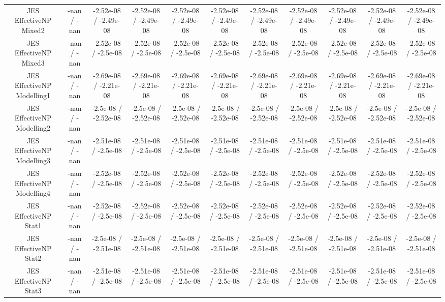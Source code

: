 \begin{table}[htbp]
\begin{center}
\begin{tabular}{|c|c|c|c|c|c|c|c|c|c|c|}
  JES EffectiveNP Mixed2 & -nan / -nan & -2.52e-08 / -2.49e-08 & -2.52e-08 / -2.49e-08 & -2.52e-08 / -2.49e-08 & -2.52e-08 / -2.49e-08 & -2.52e-08 / -2.49e-08 & -2.52e-08 / -2.49e-08 & -2.52e-08 / -2.49e-08 & -2.52e-08 / -2.49e-08 & -2.52e-08 / -2.49e-08 \\ 
  JES EffectiveNP Mixed3 & -nan / -nan & -2.52e-08 / -2.5e-08 & -2.52e-08 / -2.5e-08 & -2.52e-08 / -2.5e-08 & -2.52e-08 / -2.5e-08 & -2.52e-08 / -2.5e-08 & -2.52e-08 / -2.5e-08 & -2.52e-08 / -2.5e-08 & -2.52e-08 / -2.5e-08 & -2.52e-08 / -2.5e-08 \\ 
  JES EffectiveNP Modelling1 & -nan / -nan & -2.69e-08 / -2.21e-08 & -2.69e-08 / -2.21e-08 & -2.69e-08 / -2.21e-08 & -2.69e-08 / -2.21e-08 & -2.69e-08 / -2.21e-08 & -2.69e-08 / -2.21e-08 & -2.69e-08 / -2.21e-08 & -2.69e-08 / -2.21e-08 & -2.69e-08 / -2.21e-08 \\ 
  JES EffectiveNP Modelling2 & -nan / -nan & -2.5e-08 / -2.52e-08 & -2.5e-08 / -2.52e-08 & -2.5e-08 / -2.52e-08 & -2.5e-08 / -2.52e-08 & -2.5e-08 / -2.52e-08 & -2.5e-08 / -2.52e-08 & -2.5e-08 / -2.52e-08 & -2.5e-08 / -2.52e-08 & -2.5e-08 / -2.52e-08 \\ 
  JES EffectiveNP Modelling3 & -nan / -nan & -2.51e-08 / -2.5e-08 & -2.51e-08 / -2.5e-08 & -2.51e-08 / -2.5e-08 & -2.51e-08 / -2.5e-08 & -2.51e-08 / -2.5e-08 & -2.51e-08 / -2.5e-08 & -2.51e-08 / -2.5e-08 & -2.51e-08 / -2.5e-08 & -2.51e-08 / -2.5e-08 \\ 
  JES EffectiveNP Modelling4 & -nan / -nan & -2.52e-08 / -2.5e-08 & -2.52e-08 / -2.5e-08 & -2.52e-08 / -2.5e-08 & -2.52e-08 / -2.5e-08 & -2.52e-08 / -2.5e-08 & -2.52e-08 / -2.5e-08 & -2.52e-08 / -2.5e-08 & -2.52e-08 / -2.5e-08 & -2.52e-08 / -2.5e-08 \\ 
  JES EffectiveNP Stat1 & -nan / -nan & -2.52e-08 / -2.5e-08 & -2.52e-08 / -2.5e-08 & -2.52e-08 / -2.5e-08 & -2.52e-08 / -2.5e-08 & -2.52e-08 / -2.5e-08 & -2.52e-08 / -2.5e-08 & -2.52e-08 / -2.5e-08 & -2.52e-08 / -2.5e-08 & -2.52e-08 / -2.5e-08 \\ 
  JES EffectiveNP Stat2 & -nan / -nan & -2.5e-08 / -2.51e-08 & -2.5e-08 / -2.51e-08 & -2.5e-08 / -2.51e-08 & -2.5e-08 / -2.51e-08 & -2.5e-08 / -2.51e-08 & -2.5e-08 / -2.51e-08 & -2.5e-08 / -2.51e-08 & -2.5e-08 / -2.51e-08 & -2.5e-08 / -2.51e-08 \\ 
  JES EffectiveNP Stat3 & -nan / -nan & -2.51e-08 / -2.5e-08 & -2.51e-08 / -2.5e-08 & -2.51e-08 / -2.5e-08 & -2.51e-08 / -2.5e-08 & -2.51e-08 / -2.5e-08 & -2.51e-08 / -2.5e-08 & -2.51e-08 / -2.5e-08 & -2.51e-08 / -2.5e-08 & -2.51e-08 / -2.5e-08 \\ 

\end{tabular}
\end{center}
\end{table}
